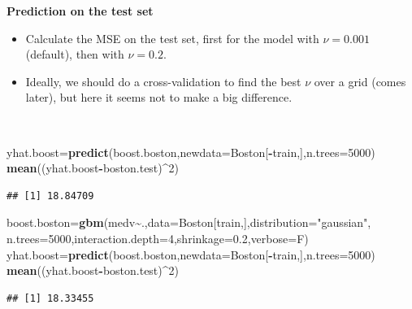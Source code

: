 \documentclass[
  10pt,
  ignorenonframetext,
]{beamer}
\newenvironment{Shaded}{\begin{snugshade}}{\end{snugshade}}
\newcommand{\AttributeTok}[1]{\textcolor[rgb]{0.13,0.29,0.53}{#1}}
\newcommand{\DecValTok}[1]{\textcolor[rgb]{0.00,0.00,0.81}{#1}}
\newcommand{\FloatTok}[1]{\textcolor[rgb]{0.00,0.00,0.81}{#1}}
\newcommand{\FunctionTok}[1]{\textcolor[rgb]{0.13,0.29,0.53}{\textbf{#1}}}
\newcommand{\NormalTok}[1]{#1}
\newcommand{\OtherTok}[1]{\textcolor[rgb]{0.56,0.35,0.01}{#1}}
\newcommand{\SpecialCharTok}[1]{\textcolor[rgb]{0.81,0.36,0.00}{\textbf{#1}}}
\newcommand{\StringTok}[1]{\textcolor[rgb]{0.31,0.60,0.02}{#1}}
\begin{document}
\begin{frame}[fragile]
\textbf{Prediction on the test set}

\begin{itemize}
\item
  Calculate the MSE on the test set, first for the model with
  \(\nu=0.001\) (default), then with \(\nu=0.2\).
\item
  Ideally, we should do a cross-validation to find the best \(\nu\) over
  a grid (comes later), but here it seems not to make a big difference.
\end{itemize}

\(~\)

\scriptsize

\begin{Shaded}
\begin{Highlighting}[]
\NormalTok{yhat.boost}\OtherTok{=}\FunctionTok{predict}\NormalTok{(boost.boston,}\AttributeTok{newdata=}\NormalTok{Boston[}\SpecialCharTok{{-}}\NormalTok{train,],}\AttributeTok{n.trees=}\DecValTok{5000}\NormalTok{)}
\FunctionTok{mean}\NormalTok{((yhat.boost}\SpecialCharTok{{-}}\NormalTok{boston.test)}\SpecialCharTok{\^{}}\DecValTok{2}\NormalTok{)}
\end{Highlighting}
\end{Shaded}

\begin{verbatim}
## [1] 18.84709
\end{verbatim}

\vspace{2mm}

\begin{Shaded}
\begin{Highlighting}[]
\NormalTok{boost.boston}\OtherTok{=}\FunctionTok{gbm}\NormalTok{(medv}\SpecialCharTok{\textasciitilde{}}\NormalTok{.,}\AttributeTok{data=}\NormalTok{Boston[train,],}\AttributeTok{distribution=}\StringTok{"gaussian"}\NormalTok{,}
                 \AttributeTok{n.trees=}\DecValTok{5000}\NormalTok{,}\AttributeTok{interaction.depth=}\DecValTok{4}\NormalTok{,}\AttributeTok{shrinkage=}\FloatTok{0.2}\NormalTok{,}\AttributeTok{verbose=}\NormalTok{F)}
\NormalTok{yhat.boost}\OtherTok{=}\FunctionTok{predict}\NormalTok{(boost.boston,}\AttributeTok{newdata=}\NormalTok{Boston[}\SpecialCharTok{{-}}\NormalTok{train,],}\AttributeTok{n.trees=}\DecValTok{5000}\NormalTok{)}
\FunctionTok{mean}\NormalTok{((yhat.boost}\SpecialCharTok{{-}}\NormalTok{boston.test)}\SpecialCharTok{\^{}}\DecValTok{2}\NormalTok{)}
\end{Highlighting}
\end{Shaded}

\begin{verbatim}
## [1] 18.33455
\end{verbatim}
\end{frame}
\end{document}
